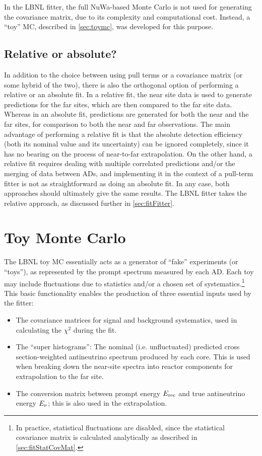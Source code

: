 \documentclass[../thesis.tex]{subfiles}
\begin{document}
In the LBNL fitter, the full NuWa-based Monte Carlo is not used for generating the covariance matrix, due to its complexity and computational cost. Instead, a ``toy'' MC, described in \autoref{sec:toymc}, was developed for this purpose.

\subsection{Relative or absolute?}
\label{sec:fitRelOrAbs}

In addition to the choice between using pull terms or a covariance matrix (or some hybrid of the two), there is also the orthogonal option of performing a relative or an absolute fit. In a relative fit, the near site data is used to generate predictions for the far sites, which are then compared to the far site data. Whereas in an absolute fit, predictions are generated for both the near and the far sites, for comparison to both the near and far observations. The main advantage of performing a relative fit is that the absolute detection efficiency (both its nominal value and its uncertainty) can be ignored completely, since it has no bearing on the process of near-to-far extrapolation. On the other hand, a relative fit requires dealing with multiple correlated predictions and/or the merging of data between ADs, and implementing it in the context of a pull-term fitter is not as straightforward as doing an absolute fit. In any case, both approaches should ultimately give the same results. The LBNL fitter takes the relative approach, as discussed further in \autoref{sec:fitFitter}.

\section{Toy Monte Carlo}
\label{sec:toymc}

The LBNL toy MC essentially acts as a generator of ``fake'' experiments (or ``toys''), as represented by the prompt spectrum measured by each AD. Each toy may include fluctuations due to statistics and/or a chosen set of systematics.\footnote{In practice, statistical fluctuations are disabled, since the statistical covariance matrix is calculated analytically as described in \autoref{sec:fitStatCovMat}.} This basic functionality enables the production of three essential inputs used by the fitter:

\begin{itemize}
\item The covariance matrices for signal and background systematics, used in calculating the $\chi^2$ during the fit.
\item The ``super histograms'': The nominal (i.e. unfluctuated) predicted cross section-weighted antineutrino spectrum produced by each core. This is used when breaking down the near-site spectra into reactor components for extrapolation to the far site.
\item The conversion matrix between prompt energy $E_\mathrm{rec}$ and true antineutrino energy $E_\mathrm{\nu}$; this is also used in the extrapolation.
\end{itemize}
\end{document}
